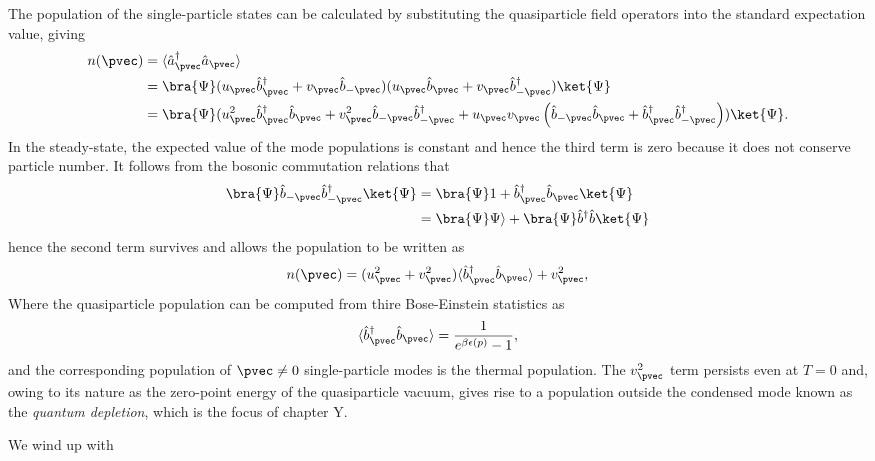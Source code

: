 {{{{{{	The population of the single-particle states can be calculated by substituting the quasiparticle field operators into the standard expectation value, giving
	\begin{align}
		n(\pvec) &= \langle\hat{a}^\dagger_\pvec \hat{a}_\pvec\rangle\\
		&= \bra{\Psi}(u_\pvec\hat{b}_\pvec^\dagger + v_\pvec \hat{b}_{-\pvec})(u_\pvec \hat{b}_\pvec + v_\pvec \hat{b}^\dagger_{-\pvec})\ket{\Psi}\\
		&=\bra{\Psi}(u_\pvec^2\hat{b}_\pvec^\dagger \hat{b}_\pvec  + v_\pvec^2 \hat{b}_{-\pvec} \hat{b}^\dagger_{-\pvec} + u_\pvec v_\pvec \left(\hat{b}_{-\pvec} \hat{b}_\pvec + \hat{b}_\pvec^\dagger  \hat{b}^\dagger_{-\pvec}\right))\ket{\Psi}.
	\end{align}
	In the steady-state, the expected value of the mode populations is constant and hence the third term is zero because it does not conserve particle number.
	It follows from the bosonic commutation relations that
	\begin{align}
		\bra{\Psi} \hat{b}_{-\pvec} \hat{b}^\dagger_{-\pvec}\ket{\Psi} &= \bra{\Psi} 1 + \hat{b}_\pvec^\dagger \hat{b}_\pvec\ket{\Psi}\\
								&= \bra{\Psi}\Psi\rangle  + \bra{\Psi}\hat{b}^\dagger \hat{b}\ket{\Psi}
	\end{align}
	hence the second term survives and allows the population to be written as
	\begin{equation}
		n(\pvec) = (u_\pvec^2+v_\pvec^2)\langle\hat{b}_\pvec^\dagger \hat{b}_\pvec\rangle + v_\pvec^2,
	\end{equation}
	Where the quasiparticle population can be computed from thire Bose-Einstein statistics as
	\begin{equation}
		\langle\hat{b}^\dagger_\pvec \hat{b}_\pvec\rangle = \frac{1}{e^{\beta \epsilon(p)}-1},
	\end{equation}
	and the corresponding population of $\pvec\neq0$ single-particle modes is the thermal population.
	The $v_\pvec^2$ term persists even at $T=0$ and, owing to its nature as the zero-point energy of the quasiparticle vacuum, gives rise to a population outside the condensed mode known as the \emph{quantum depletion}, which is the focus of chapter Y.

	

	We wind up with
	
}}}}}}
